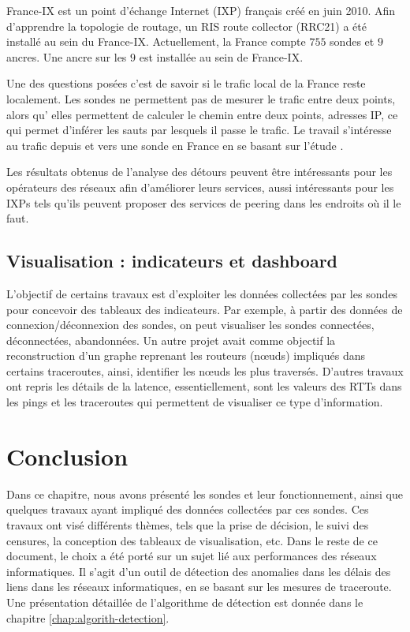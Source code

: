 France-IX est un point d'échange Internet (IXP) français créé en juin 2010. Afin d'apprendre la topologie de routage, un RIS route collector (RRC21) a été installé au sein du France-IX. Actuellement, la France compte $755$ sondes   et $9$ ancres. Une ancre sur les $9$ est installée au sein de France-IX.

Une des questions posées c'est de savoir si le trafic local de la France reste localement.  Les sondes   ne permettent pas de mesurer le trafic entre deux points, alors qu' elles permettent de calculer le chemin entre deux points, adresses IP, ce qui permet d'inférer les sauts par lesquels il passe le trafic. Le travail \cite{France-IX} s'intéresse au trafic depuis et vers une sonde en France en se basant sur l'étude \cite{Emile-Aben-IXP-countries}.


Les résultats obtenus de l'analyse des détours peuvent être intéressants pour les opérateurs des réseaux afin d'améliorer leurs services, aussi intéressants pour les IXPs tels qu'ils peuvent  proposer des services de peering dans les endroits où il le faut.


\subsection{Visualisation : indicateurs et dashboard}

L'objectif de certains travaux est  d'exploiter les données collectées par les sondes  pour concevoir des tableaux des indicateurs. Par exemple, à partir des données de connexion/déconnexion des sondes, on peut visualiser les sondes connectées, déconnectées, abandonnées. Un autre projet avait comme objectif la reconstruction d'un graphe reprenant les routeurs (n\oe{}uds) impliqués dans certains traceroutes, ainsi, identifier les n\oe{}uds les plus traversés. D'autres travaux ont repris les détails de la latence, essentiellement, sont les valeurs des RTTs dans les pings et les traceroutes qui permettent de visualiser ce type d'information. 




\section{Conclusion}

Dans ce chapitre, nous avons présenté les sondes  et leur fonctionnement, ainsi que quelques travaux ayant impliqué des données collectées par ces sondes.  Ces travaux ont visé différents thèmes, tels que la prise de décision, le suivi des censures, la conception des tableaux de visualisation, etc. Dans le reste de ce document, le choix a été porté sur un sujet lié aux performances des réseaux informatiques. Il s'agit d'un outil de détection des anomalies dans les délais des liens dans les réseaux informatiques, en se basant sur les mesures de traceroute. Une présentation détaillée de l'algorithme de détection est donnée dans le chapitre \ref{chap:algorith-detection}.

